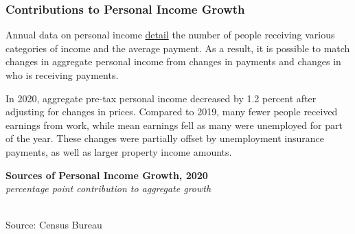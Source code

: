 \documentclass{report}
\newcommand{\barylab}[2]{yticklabel style={text width=#1, align=right, 
		style={black!70}, text height=#2},}
\newcommand{\bbar}[2]{extra #1 ticks = {{#2}}, extra #1 tick labels = ,
		extra #1 tick style = {grid=major, grid style={thick, black!25}},}
\newcommand{\barplotnogrid}{xbar=0pt, axis line style={draw=none},
	    yticklabel style={align=left, anchor=east},
      		xmajorticks=false, ymajorgrids=false,   
	    ytick=data, tickwidth=0pt, area legend, reverse legend,
	    nodes near coords, nodes near coords align={horizontal},}
\begin{document}
{\newpage 
\begin{minipage}{0.76\textwidth} 
\subsubsection*{\color{black!70} \seriffont Contributions to Personal Income Growth}
\small Annual data on personal income \href{https://www.census.gov/data/tables/time-series/demo/income-poverty/cps-pinc/pinc-09.html}{detail} the number of people receiving various categories of income and the average payment. As a result, it is possible to match changes in aggregate personal income from changes in payments and changes in who is receiving payments. 

In 2020, aggregate pre-tax personal income decreased by 1.2 percent after adjusting for changes in prices. Compared to 2019, many fewer people received earnings from work, while mean earnings fell as many were unemployed for part of the year. These changes were partially offset by unemployment insurance payments, as well as larger property income amounts. 
\vspace{2mm}

\begin{minipage}{0.55\textwidth}
\normalsize \textbf{Sources of Personal Income Growth, 2020}\\
\footnotesize{\textit{percentage point contribution to aggregate growth}}\\
\hspace*{-4mm} \\
\footnotesize{Source: Census Bureau}
\end{minipage} 
\vspace{5mm}


\end{minipage}}
\end{document}
